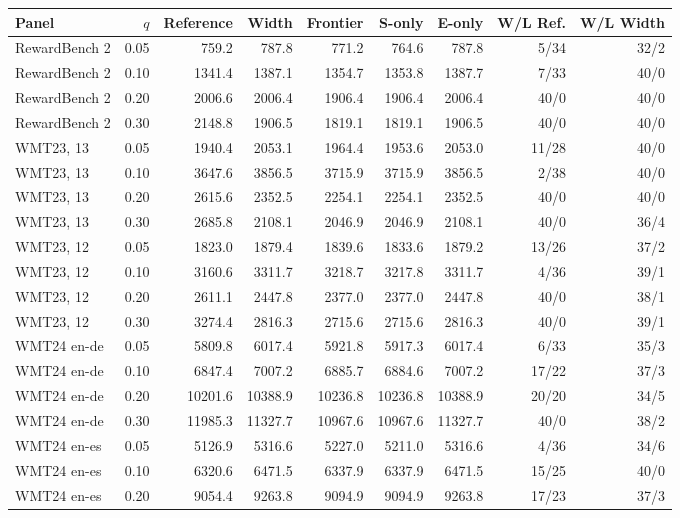 \begin{table}[t]
\centering\small
\setlength{\tabcolsep}{4pt}
\begin{tabular}{lrrrrrrrr}
\toprule
Panel & $q$ & Reference & Width & Frontier & S-only & E-only & W/L Ref. & W/L Width \\
\midrule
RewardBench 2 & 0.05 & 759.2 & 787.8 & 771.2 & 764.6 & 787.8 & 5/34 & 32/2 \\
RewardBench 2 & 0.10 & 1341.4 & 1387.1 & 1354.7 & 1353.8 & 1387.7 & 7/33 & 40/0 \\
RewardBench 2 & 0.20 & 2006.6 & 2006.4 & 1906.4 & 1906.4 & 2006.4 & 40/0 & 40/0 \\
RewardBench 2 & 0.30 & 2148.8 & 1906.5 & 1819.1 & 1819.1 & 1906.5 & 40/0 & 40/0 \\
WMT23, 13 & 0.05 & 1940.4 & 2053.1 & 1964.4 & 1953.6 & 2053.0 & 11/28 & 40/0 \\
WMT23, 13 & 0.10 & 3647.6 & 3856.5 & 3715.9 & 3715.9 & 3856.5 & 2/38 & 40/0 \\
WMT23, 13 & 0.20 & 2615.6 & 2352.5 & 2254.1 & 2254.1 & 2352.5 & 40/0 & 40/0 \\
WMT23, 13 & 0.30 & 2685.8 & 2108.1 & 2046.9 & 2046.9 & 2108.1 & 40/0 & 36/4 \\
WMT23, 12 & 0.05 & 1823.0 & 1879.4 & 1839.6 & 1833.6 & 1879.2 & 13/26 & 37/2 \\
WMT23, 12 & 0.10 & 3160.6 & 3311.7 & 3218.7 & 3217.8 & 3311.7 & 4/36 & 39/1 \\
WMT23, 12 & 0.20 & 2611.1 & 2447.8 & 2377.0 & 2377.0 & 2447.8 & 40/0 & 38/1 \\
WMT23, 12 & 0.30 & 3274.4 & 2816.3 & 2715.6 & 2715.6 & 2816.3 & 40/0 & 39/1 \\
WMT24 en-de & 0.05 & 5809.8 & 6017.4 & 5921.8 & 5917.3 & 6017.4 & 6/33 & 35/3 \\
WMT24 en-de & 0.10 & 6847.4 & 7007.2 & 6885.7 & 6884.6 & 7007.2 & 17/22 & 37/3 \\
WMT24 en-de & 0.20 & 10201.6 & 10388.9 & 10236.8 & 10236.8 & 10388.9 & 20/20 & 34/5 \\
WMT24 en-de & 0.30 & 11985.3 & 11327.7 & 10967.6 & 10967.6 & 11327.7 & 40/0 & 38/2 \\
WMT24 en-es & 0.05 & 5126.9 & 5316.6 & 5227.0 & 5211.0 & 5316.6 & 4/36 & 34/6 \\
WMT24 en-es & 0.10 & 6320.6 & 6471.5 & 6337.9 & 6337.9 & 6471.5 & 15/25 & 40/0 \\
WMT24 en-es & 0.20 & 9054.4 & 9263.8 & 9094.9 & 9094.9 & 9263.8 & 17/23 & 37/3 \\

\end{tabular}
\end{table}
